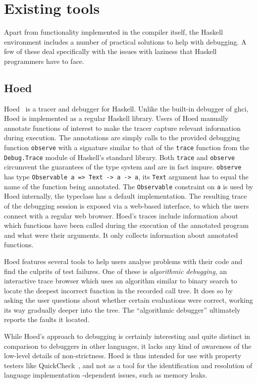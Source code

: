 \documentclass[thesis=B,english]{FITthesis}[2019/12/23]
\newcommand{\hsType}[1]{\texttt{#1}}
\newcommand{\hsIdent}[1]{\texttt{#1}}
\newcommand{\hsModule}[1]{\texttt{#1}}
\begin{document}
\section{Existing tools} \label{sec:existing-tools}
Apart from functionality implemented in the compiler itself, the Haskell
environment includes a number of practical solutions to help with debugging. A
few of these deal specifically with the issues with laziness that Haskell
programmers have to face.

\subsection*{Hoed} \label{sec:hoed}
Hoed~\cite{gh-hoed} is a tracer and debugger for Haskell. Unlike the built-in
debugger of \acrshort{ghci}, Hoed is implemented as a regular Haskell library.
Users of Hoed manually annotate functions of interest to make the tracer
capture relevant information during execution. The annotations are simply calls
to the provided debugging function \hsIdent{observe} with a signature similar
to that of the \hsIdent{trace} function from the \hsModule{Debug.Trace} module
of Haskell's standard library. Both \hsIdent{trace} and \hsIdent{observe}
circumvent the guarantees of the type system and are in fact impure.
\hsIdent{observe} has type \hsType{Observable a => Text -> a -> a}, its
\hsType{Text} argument has to equal the name of the function being annotated.
The \hsType{Observable} constraint on \hsType{a} is used by Hoed internally,
the typeclass has a default implementation. The resulting trace of the
debugging session is exposed via a web-based interface, to which the users
connect with a regular web browser. Hoed's traces include information about
which functions have been called during the execution of the annotated program
and what were their arguments. It only collects information about annotated
functions.

Hoed features several tools to help users analyse problems with their code and
find the culprits of test failures. One of these is \textit{algorithmic
debugging}, an interactive trace browser which uses an algorithm similar to
binary search to locate the deepest incorrect function in the recorded call
tree. It does so by asking the user questions about whether certain evaluations
were correct, working its way gradually deeper into the tree. The ``algorithmic
debugger'' ultimately reports the faults it located.

While Hoed's approach to debugging is certainly interesting and quite distinct
in comparison to debuggers in other languages, it lacks any kind of awareness
of the low-level details of non-strictness. Hoed is thus intended for use with
property testers like QuickCheck~\cite{quickcheck-paper}, and not as a tool for
the identification and resolution of language implementation -dependent issues,
such as memory leaks.
\end{document}
